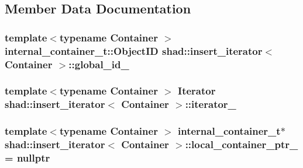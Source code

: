 \subsection{Member Data Documentation}
\hypertarget{classshad_1_1insert__iterator_ab90ac3bffe8239a3d5472ad669164597}{
\subsubsection[{global\-\_\-id\-\_\-}]{\setlength{\rightskip}{0pt plus 5cm}template$<$typename Container $>$ internal\-\_\-container\-\_\-t\-::\-Object\-I\-D {\bf shad\-::insert\-\_\-iterator}$<$ Container $>$\-::global\-\_\-id\-\_\-\hspace{0.3cm}{\ttfamily [protected]}}}\label{classshad_1_1insert__iterator_ab90ac3bffe8239a3d5472ad669164597}
\hypertarget{classshad_1_1insert__iterator_a0d26bcdf8d5485fd5a703245bb9d75a5}{
\subsubsection[{iterator\-\_\-}]{\setlength{\rightskip}{0pt plus 5cm}template$<$typename Container $>$ {\bf Iterator} {\bf shad\-::insert\-\_\-iterator}$<$ Container $>$\-::iterator\-\_\-\hspace{0.3cm}{\ttfamily [protected]}}}\label{classshad_1_1insert__iterator_a0d26bcdf8d5485fd5a703245bb9d75a5}
\hypertarget{classshad_1_1insert__iterator_ab1fb4edf1ef845937bf22731526c2b9e}{
\subsubsection[{local\-\_\-container\-\_\-ptr\-\_\-}]{\setlength{\rightskip}{0pt plus 5cm}template$<$typename Container $>$ {\bf internal\-\_\-container\-\_\-t}$\ast$ {\bf shad\-::insert\-\_\-iterator}$<$ Container $>$\-::local\-\_\-container\-\_\-ptr\-\_\- = nullptr\hspace{0.3cm}{\ttfamily [protected]}}}\label{classshad_1_1insert__iterator_ab1fb4edf1ef845937bf22731526c2b9e}
